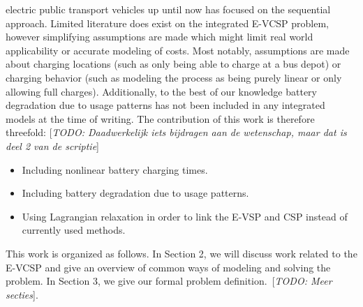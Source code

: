 \documentclass[]{book}
\newcommand{\todo}[1]{{\color{red}[\textit{TODO: #1}]}}
\begin{document}
electric public transport vehicles up until now has focused on the sequential
approach. Limited literature does exist on the integrated E-VCSP problem, however
simplifying assumptions are made which might limit real world applicability or
accurate modeling of costs. Most notably, assumptions are made about charging
locations (such as only being able to charge at a bus depot) or charging
behavior (such as modeling the process as being purely linear or only allowing
full charges). Additionally, to the best of our knowledge battery degradation
due to usage patterns has not been included in any integrated models at the
time of writing. The contribution of this work is therefore threefold: \todo{Daadwerkelijk iets bijdragen aan de wetenschap, maar dat is deel 2 van de scriptie}
\begin{itemize}
  \item Including nonlinear battery charging times.
  \item Including battery degradation due to usage patterns.
  \item Using Lagrangian relaxation in order to link the E-VSP and CSP instead of
        currently used methods.
\end{itemize}
This work is organized as follows. In Section 2, we will discuss work related to the E-VCSP and give an overview of common ways of modeling and solving the problem. In Section 3, we give our formal problem definition.\ \todo{Meer secties}.
\end{document}
